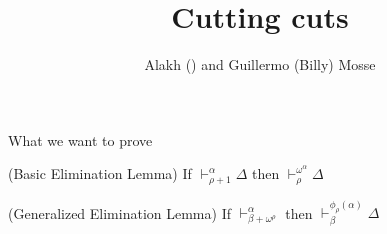 \documentclass[10pt]{beamer}
\title{Cutting cuts}
\author{Alakh () and Guillermo (Billy) Mosse}
\institute{() and Universidad de Buenos Aires}
\newcommand{\sintcons}[2]{\vdash^{#1}_{#2}}
\begin{document}
\maketitle



	
\begin{frame}{What we want to prove}




\begin{lemma}{(Basic Elimination Lemma)}
If $\sintcons{\alpha}{\rho+1}\Delta$ then $\sintcons{\omega^\alpha}{\rho} \Delta$
\end{lemma} \pause


\begin{lemma}{(Generalized Elimination Lemma)}
If $\sintcons{\alpha}{\beta+\omega^\rho}$ then $\sintcons{\phi_\rho(\alpha)}{\beta} \Delta$
\end{lemma}




\end{frame}
\end{document}
